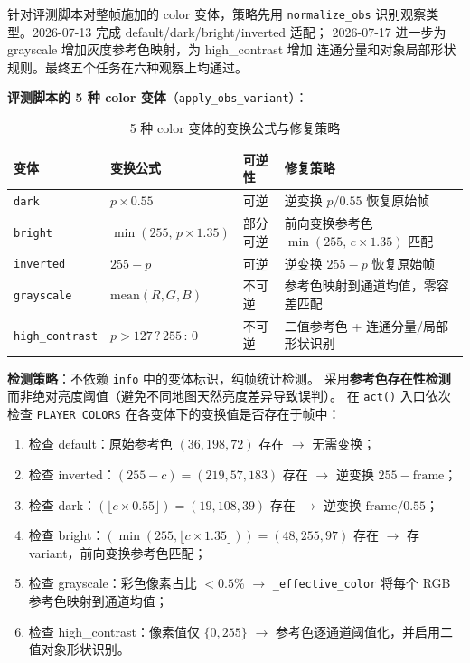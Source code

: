 \documentclass[12pt,a4paper]{ctexart}
\begin{document}
针对评测脚本对整帧施加的 color 变体，策略先用 \texttt{normalize\_obs}
识别观察类型。2026-07-13 完成 default/dark/bright/inverted 适配；
2026-07-17 进一步为 grayscale 增加灰度参考色映射，为 high\_contrast 增加
连通分量和对象局部形状规则。最终五个任务在六种观察上均通过。

\textbf{评测脚本的 5 种 color 变体}（\texttt{apply\_obs\_variant}）：

\begin{table}[H]
\centering
\begin{tabular}{p{}p{}p{}p{}}
\toprule
变体 & 变换公式 & 可逆性 & 修复策略 \\
\midrule
\texttt{dark} & $p \times 0.55$ & 可逆 & 逆变换 $p / 0.55$ 恢复原始帧 \\
\texttt{bright} & $\min(255,\, p \times 1.35)$ & 部分可逆 & 前向变换参考色 $\min(255,\, c \times 1.35)$ 匹配 \\
\texttt{inverted} & $255 - p$ & 可逆 & 逆变换 $255 - p$ 恢复原始帧 \\
\texttt{grayscale} & $\text{mean}(R,G,B)$ & 不可逆 & 参考色映射到通道均值，零容差匹配 \\
\texttt{high\_contrast} & $p > 127\,?\,255\,:\,0$ & 不可逆 & 二值参考色 + 连通分量/局部形状识别 \\
\bottomrule
\end{tabular}
\caption{5 种 color 变体的变换公式与修复策略}
\end{table}

\textbf{检测策略}：不依赖 \texttt{info} 中的变体标识，纯帧统计检测。
采用\textbf{参考色存在性检测}而非绝对亮度阈值（避免不同地图天然亮度差异导致误判）。
在 \texttt{act()} 入口依次检查 \texttt{PLAYER\_COLORS} 在各变体下的变换值是否存在于帧中：

\begin{enumerate}[leftmargin=2em]
  \item 检查 default：原始参考色 $(36, 198, 72)$ 存在 $\to$ 无需变换；
  \item 检查 inverted：$(255-c) = (219, 57, 183)$ 存在 $\to$ 逆变换 $255 - \text{frame}$；
  \item 检查 dark：$(\lfloor c \times 0.55 \rfloor) = (19, 108, 39)$ 存在 $\to$ 逆变换 $\text{frame} / 0.55$；
  \item 检查 bright：$(\min(255, \lfloor c \times 1.35 \rfloor)) = (48, 255, 97)$ 存在 $\to$ 存 variant，前向变换参考色匹配；
  \item 检查 grayscale：彩色像素占比 $< 0.5\%$ $\to$
  \texttt{\_effective\_color} 将每个 RGB 参考色映射到通道均值；
  \item 检查 high\_contrast：像素值仅 $\{0, 255\}$ $\to$
  参考色逐通道阈值化，并启用二值对象形状识别。
\end{enumerate}
\end{document}
